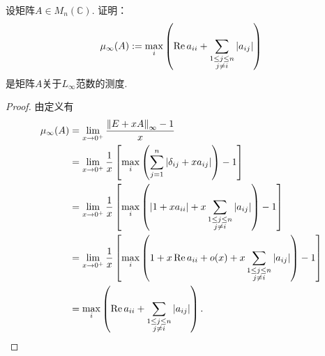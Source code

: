 \begin{example}
设矩阵\(A \in M_n(\mathbb{C})\).
证明：\begin{equation*}
	\mu_\infty(A)
	:=
	\max_i \left(
		\Re a_{ii}
		+ \sum_{\substack{1 \leq j \leq n \\ j \neq i}} \abs{a_{ij}}
	\right)
\end{equation*}
是矩阵\(A\)关于\(L_\infty\)范数的测度.
\begin{proof}
由定义有\begin{align*}
	\mu_\infty(A)
	&= \lim_{x \to 0^+} \frac{\norm{E + x A}_\infty - 1}{x} \\
	&= \lim_{x \to 0^+} \frac{1}{x} \left[ \max_i \left( \sum_{j=1}^n \abs{ \delta_{ij} + x a_{ij} } \right) - 1 \right] \\
	&= \lim_{x \to 0^+} \frac{1}{x} \left[ \max_i \left( \abs{ 1 + x a_{ii} } + x \sum_{\substack{1 \leq j \leq n \\ j \neq i}} \abs{a_{ij}} \right) - 1 \right] \\
	&= \lim_{x \to 0^+} \frac{1}{x} \left[ \max_i \left( 1 + x \Re a_{ii} + o(x) + x \sum_{\substack{1 \leq j \leq n \\ j \neq i}} \abs{a_{ij}} \right) - 1 \right] \\
	&= \max_i \left( \Re a_{ii} + \sum_{\substack{1 \leq j \leq n \\ j \neq i}} \abs{a_{ij}} \right).
	\qedhere
\end{align*}
\end{proof}
\end{example}

